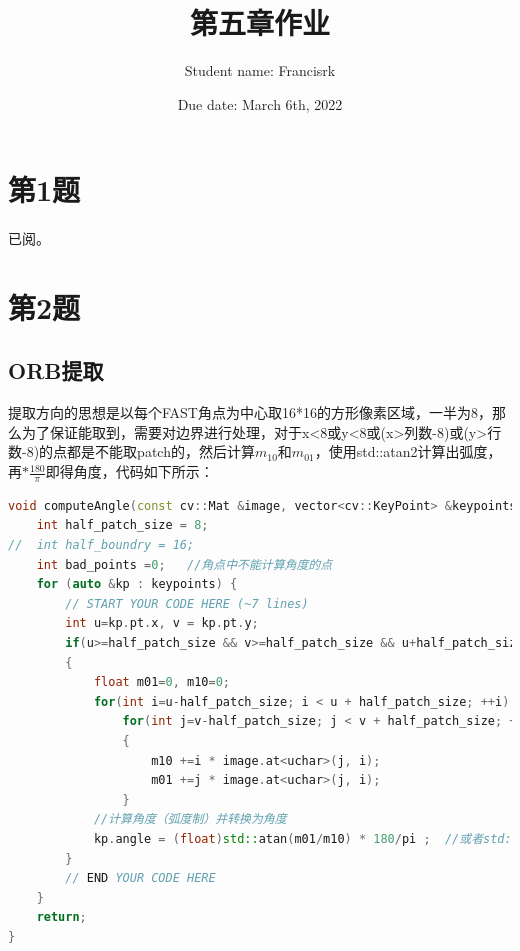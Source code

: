 \documentclass[40pt,a4paper，UTF8]{ctexart}
\title{第五章作业}
\author{Student name: Francisrk}
\date{Due date: March 6th, 2022}
\numberwithin{equation}{section}
\begin{document}
\maketitle   %

\section{第1题}
\paragraph{}
已阅。
\paragraph{}


\section{第2题}
\paragraph{}

\subsection{ORB提取}
提取方向的思想是以每个FAST角点为中心取16*16的方形像素区域，一半为8，那么为了保证能取到，需要对边界进行处理，对于x<8或y<8或(x>列数-8)或(y>行数-8)的点都是不能取patch的，然后计算$m_{10}$和$m_{01}$，使用std::atan2计算出弧度，再$*\frac{180}{\pi}$即得角度，代码如下所示：
\begin{lstlisting}[language=C++, caption=computeORB.cpp]
void computeAngle(const cv::Mat &image, vector<cv::KeyPoint> &keypoints) {
    int half_patch_size = 8;
//  int half_boundry = 16;
    int bad_points =0;   //角点中不能计算角度的点
    for (auto &kp : keypoints) {
        // START YOUR CODE HERE (~7 lines)
        int u=kp.pt.x, v = kp.pt.y;
        if(u>=half_patch_size && v>=half_patch_size && u+half_patch_size<=image.cols && v+half_patch_size<=image.rows)
        {
            float m01=0, m10=0;
            for(int i=u-half_patch_size; i < u + half_patch_size; ++i)  //x方向遍历16个点(右)
                for(int j=v-half_patch_size; j < v + half_patch_size; ++j)  //y方向遍历16个点(下)
                {
                    m10 +=i * image.at<uchar>(j, i);
                    m01 +=j * image.at<uchar>(j, i);
                }
            //计算角度（弧度制）并转换为角度
            kp.angle = (float)std::atan(m01/m10) * 180/pi ;  //或者std::atan2(m01, m10)*180/pi;
        }
        // END YOUR CODE HERE
    }
    return;
}

\end{lstlisting}
\end{document}
